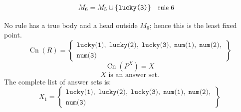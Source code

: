 \documentclass[a4paper,11pt]{article}
\newif\ifexplain
\newcommand{\explain}[1]{\ifexplain\begin{erklbox}#1\end{erklbox}\fi}
\newcommand{\why}[1]{\text{\small #1}}
\newcommand{\at}[1]{\texttt{#1}}
\begin{document}
\begin{align*}
M_{6} &= M_{5}\cup \{\at{lucky(3)}\} && \why{rule 6}
\end{align*}
\explain{Für $\at{lucky(3)}$ brauchen wir $\at{num(3)}$. Weil diese Voraussetzungen bereits hergeleitet sind, dürfen wir den Regelkopf jetzt aufnehmen und alle bisherigen Atome behalten; bei einer fehlenden Voraussetzung würde diese Regel dagegen noch nichts beitragen.}
No rule has a true body and a head outside $M_{6}$; hence this is the least fixed point.
\[
\operatorname{Cn}(R)=\left\{\begin{gathered}\at{lucky(1)},\;\at{lucky(2)},\;\at{lucky(3)},\;\at{num(1)},\;\at{num(2)},\\\at{num(3)}\end{gathered}\right\}
\]
\[
\operatorname{Cn}(P^X)=X
\]
\[
\boxed{X\text{ is an answer set.}}
\]
The complete list of answer sets is:
\[
\boxed{X_1=\left\{\begin{gathered}\at{lucky(1)},\;\at{lucky(2)},\;\at{lucky(3)},\;\at{num(1)},\;\at{num(2)},\\\at{num(3)}\end{gathered}\right\}}
\]
\end{document}
